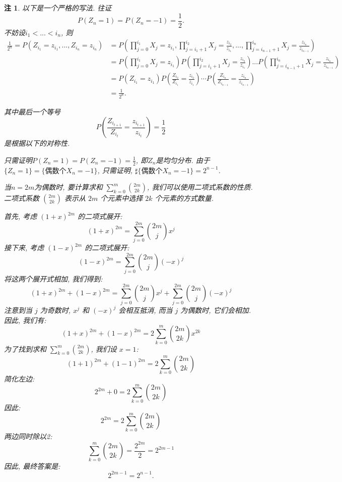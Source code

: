 \documentclass[UTF8, a4paper]{article}
\newtheorem*{remark}{注}
\begin{document}
\begin{remark}
以下是一个严格的写法. 往证
$$
P(Z_n = 1) = P(Z_n = -1) = \frac{1}{2}.
$$
不妨设\(i_1 < ...< i_n\), 则
\begin{align*}
    \frac{1}{2^n}= P(Z_{i_1} = z_{i_1}, ..., Z_{i_n} = z_{i_n}) 
&= P\left(\prod_{j=0}^{i_1} X_j = z_{i_1}, \prod_{j = i_{1} + 1}^{i_2} X_j = \frac{z_{i_2}}{z_{i_1}}, ..., \prod_{j=i_{n-1}+1}^{i_{n}}X_j = \frac{z_{i_n}}{z_{i_{n-1}}}\right) \\
&= P\left(\prod_{j=0}^{i_1} X_j = z_{i_1}\right) P\left( \prod_{j = i_{1} + 1}^{i_2} X_j = \frac{z_{i_2}}{z_{i_1}}\right)  ...  P\left(\prod_{j=i_{n-1}+1}^{i_{n}}X_j = \frac{z_{i_n}}{z_{i_{n-1}}}\right) \\
&= P(Z_{i_1} = z_{i_1}) P\left(\frac{Z_{i_2}}{Z_{i_1}} = \frac{z_{i_2}}{z_{i_1}}\right) \cdots P\left(\frac{Z_{i_n}}{Z_{i_{n-1}}} = \frac{z_{i_n}}{z_{i_{n-1}}}\right) \\
&= \frac{1}{2^n}.
\end{align*}

其中最后一个等号
$$
P\left(\frac{Z_{i_{t+1}}}{Z_{i_t}} = \frac{z_{i_{t+1}}}{z_{i_t}}\right) = \frac{1}{2}
$$
是根据以下的对称性.

只需证明\(P(Z_n = 1) = P(Z_n = -1) = \frac{1}{2}\), 即\(Z_n\)是均匀分布.
由于\(\{Z_n = 1\} = \{\text{偶数个} X_n = -1\}\), 只需证明, \(\sharp\{\text{偶数个} X_n = -1\} = 2^{n-1}\). 

当\(n = 2m\)为偶数时, 
要计算求和 \(\sum_{k = 0}^{m} \binom{2m}{2k}\), 我们可以使用二项式系数的性质. 二项式系数 \(\binom{2m}{2k}\) 表示从 \(2m\) 个元素中选择 \(2k\) 个元素的方式数量. 

首先, 考虑 \((1 + x)^{2m}\) 的二项式展开:
\[
(1 + x)^{2m} = \sum_{j=0}^{2m} \binom{2m}{j} x^j
\]
接下来, 考虑 \((1 - x)^{2m}\) 的二项式展开:
\[
(1 - x)^{2m} = \sum_{j=0}^{2m} \binom{2m}{j} (-x)^j
\]
将这两个展开式相加, 我们得到:
\[
(1 + x)^{2m} + (1 - x)^{2m} = \sum_{j=0}^{2m} \binom{2m}{j} x^j + \sum_{j=0}^{2m} \binom{2m}{j} (-x)^j
\]
注意到当 \(j\) 为奇数时, \(x^j\) 和 \((-x)^j\) 会相互抵消, 而当 \(j\) 为偶数时, 它们会相加. 因此, 我们有:
\[
(1 + x)^{2m} + (1 - x)^{2m} = 2 \sum_{k=0}^{m} \binom{2m}{2k} x^{2k}
\]
为了找到求和 \(\sum_{k=0}^{m} \binom{2m}{2k}\), 我们设 \(x = 1\):
\[
(1 + 1)^{2m} + (1 - 1)^{2m} = 2 \sum_{k=0}^{m} \binom{2m}{2k}
\]
简化左边:
\[
2^{2m} + 0 = 2 \sum_{k=0}^{m} \binom{2m}{2k}
\]
因此:
\[
2^{2m} = 2 \sum_{k=0}^{m} \binom{2m}{2k}
\]
两边同时除以2:
\[
\sum_{k=0}^{m} \binom{2m}{2k} = \frac{2^{2m}}{2} = 2^{2m-1}
\]
因此, 最终答案是:
\[
\boxed{2^{2m-1}} = 2^{n-1}.
\]


\end{remark}
\end{document}
